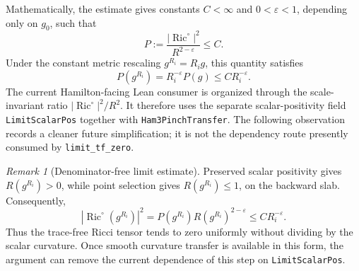\documentclass[11pt]{article}
\theoremstyle{plain}
\theoremstyle{definition}
\theoremstyle{remark}
\newtheorem{remark}[theorem]{Remark}
\newcommand{\Ric}{\operatorname{Ric}}
\newcommand{\norm}[1]{\left|#1\right|}
\newcommand{\eps}{\varepsilon}
\newcommand{\leanref}[1]{\nolinkurl{#1}}
\begin{document}
Mathematically, the estimate gives constants \(C<\infty\) and
\(0<\eps<1\), depending only on \(g_0\), such that
\[
P:=\frac{\norm{\Ric^\circ}^2}{R^{2-\eps}}\le C.
\]
Under the constant metric rescaling $g^{R_i}=R_i g$, this quantity satisfies
\[
P(g^{R_i})=R_i^{-\eps}P(g)\le C R_i^{-\eps}.
\]
The current Hamilton-facing Lean consumer is organized through the
scale-invariant ratio \(\norm{\Ric^\circ}^2/R^2\).  It therefore uses the
separate scalar-positivity field \leanref{LimitScalarPos} together with
\leanref{Ham3PinchTransfer}.  The following observation records a cleaner
future simplification; it is not the dependency route presently consumed by
\leanref{limit_tf_zero}.

\begin{remark}[Denominator-free limit estimate]
\label{rem:denominator-free-limit}
Preserved scalar positivity gives $R(g^{R_i})>0$, while point selection gives
$R(g^{R_i})\le1$, on the backward slab.  Consequently,
\[
\norm{\Ric^\circ(g^{R_i})}^2
=P(g^{R_i})R(g^{R_i})^{2-\eps}
\le C R_i^{-\eps}.
\]
Thus the trace-free Ricci tensor tends to zero uniformly without dividing by
the scalar curvature.  Once smooth curvature transfer is available in this
form, the argument can remove the current dependence of this step on
\leanref{LimitScalarPos}.
\end{remark}
\end{document}
